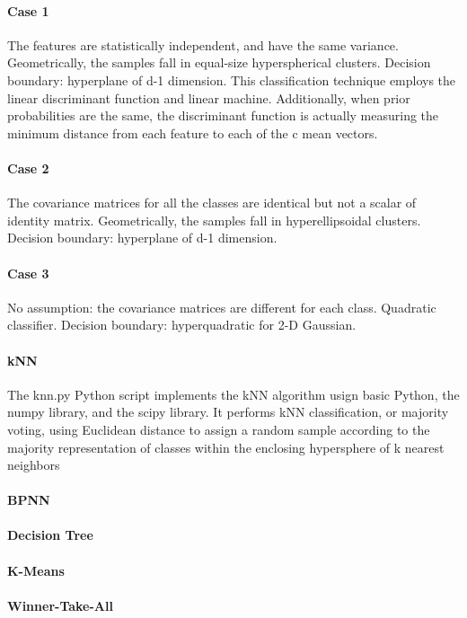 \documentclass{article}
\begin{document}
\paragraph{Case 1}
The features are statistically independent, and have the same variance.  
Geometrically, the samples fall in equal-size hyperspherical clusters.  
Decision boundary: hyperplane of d-1 dimension.  This classification technique employs the
linear discriminant function and linear machine.  Additionally, when prior probabilities are
the same, the discriminant function is actually measuring the minimum distance from each
feature to each of the c mean vectors.
\paragraph{Case 2}
The covariance matrices for all the classes are identical but not a scalar of identity matrix.
Geometrically, the samples fall in hyperellipsoidal clusters.  
Decision boundary: hyperplane of d-1 dimension.
\paragraph{Case 3}
No assumption: the covariance matrices are different for each class.  
Quadratic classifier.  
Decision boundary: hyperquadratic for 2-D Gaussian.

\paragraph{kNN} 
The knn.py Python script implements the kNN algorithm usign basic Python, the numpy library,
and the scipy library.  It performs kNN classification, or majority voting, using Euclidean
distance to assign a random sample according to the majority representation of classes
within the enclosing hypersphere of k nearest neighbors

\paragraph{BPNN} 
\paragraph{Decision Tree} 
\paragraph{K-Means} 
\paragraph{Winner-Take-All} 
\end{document}
